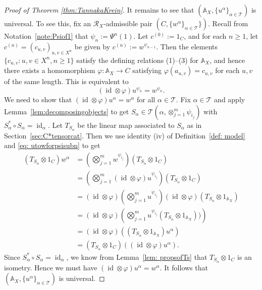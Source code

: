 \documentclass[12pt, a4paper]{amsart}
\def\id{\operatorname{id}}
\def\A{\mathbb{A}}
\def\RR{\mathcal{R}}
\def\TT{\mathcal{T}}
\theoremstyle{definition}
\theoremstyle{remark}
\numberwithin{equation}{section}
\begin{document}
\begin{proof}[Proof of Theorem \ref{thm:TannakaKrein}]
It remains to see that $(\A_X,\{u^\alpha\}_{\alpha\in\TT})$ is universal. To see this, fix an $\RR_X$-admissible pair $(C,\{w^\alpha\}_{\alpha\in\TT}\})$. Recall from Notation~\ref{note:Psiof1} that $\psi_n:=\Psi^{n}(1)$. Let $c^{(0)}:=1_C$, and for each $n\geq 1$, let $c^{(n)} = (c_{u,v})_{u,v\in X^n}$ be given by $c^{(n)}:=w^{\psi_{n-1}}$. Then the elements $\{c_{u,v} : u,v\in X^n, n\geq 1\}$ satisfy the defining relations (1)--(3) for $\A_X$, and hence there exists a homomorphism $\varphi : \A_X \to C$ satisfying $\varphi(a_{u,v}) = c_{u,v}$ for each $u,v$ of the same length. This is equivalent to
\begin{equation}\label{eq: utowforpsisubn}
 (\id\otimes\varphi)u^{\psi_n} = w^{\psi_n}.
\end{equation}
We need to show that $(\id\otimes \varphi)u^\alpha = w^\alpha$ for all $\alpha\in\TT$. Fix $\alpha\in\TT$ and apply Lemma~\ref{lem:decomposingobjects} to get $S_\alpha\in\mathcal{T}(\alpha,\otimes_{j=1}^m\psi_{i_j})$ with $S_\alpha^*\circ S_\alpha=\id_\alpha$. Let $T_{S_\alpha}$ be the linear map associated to $S_\alpha$ as in Section~\ref{sec:C*tensorcat}. Then we use identity (iv) of Definition~\ref{def: model} and \eqref{eq: utowforpsisubn} to get
\begin{align*}
	(T_{S_\alpha}\otimes 1_C)w^{\alpha} &= \left(\bigotimes_{j=1}^m w^{\psi_{i_j}}\right)(T_{S_\alpha}\otimes 1_C) \\
	&= \left(\bigotimes_{j=1}^m (\id\otimes\varphi)u^{\psi_{i_j}}\right)(T_{S_\alpha}\otimes 1_C) \\
	&= (\id\otimes\varphi)\left(\bigotimes_{j=1}^m u^{\psi_{i_j}}\right)(\id\otimes\varphi)(T_{S_\alpha}\otimes 1_{\A_X}) \\
	&= (\id\otimes\varphi)\left(\bigotimes_{j=1}^m u^{\psi_{i_j}}(T_{S_\alpha}\otimes 1_{\A_X}))\right) \\
	&= (\id\otimes\varphi)\left((T_{S_\alpha}\otimes 1_{\A_X}) u^{\alpha} \right) \\
	&= (T_{S_\alpha}	\otimes 1_C)\left( (\id\otimes\varphi)u^{\alpha}\right).
\end{align*}
Since $S_\alpha^*\circ S_\alpha=\id_\alpha$, we know from Lemma~\ref{lem: propsofTs} that $T_{S_\alpha}\otimes 1_C$ is an isometry. Hence we must have $(\id\otimes\varphi)u^{\alpha}=w^{\alpha}$. It follows that $(\A_X,\{u^\alpha\}_{\alpha\in\TT})$ is universal. 
\end{proof}
\end{document}
